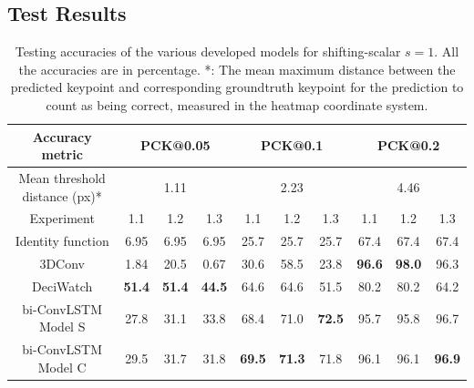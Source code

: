 \documentclass[./main.tex]{subfiles}
\begin{document}
\subsection{Test Results}
\label{subsec:pretrain_test_res}
\begin{table}[htbp]
    \begin{tabular}{c||ccc|ccc|ccc}
        \hline
        Accuracy metric & \multicolumn{3}{c}{PCK@0.05} & \multicolumn{3}{c}{PCK@0.1} & \multicolumn{3}{c}{PCK@0.2} \\
        \hline
        Mean threshold distance (px)* & \multicolumn{3}{c}{1.11} & \multicolumn{3}{c}{2.23} & \multicolumn{3}{c}{4.46} \\
        \hline
        Experiment & 1.1 & 1.2 & 1.3 & 1.1 & 1.2 & 1.3 & 1.1 & 1.2 & 1.3 \\
        \hline
        \hline
        Identity function & 6.95 & 6.95 & 6.95 & 25.7 & 25.7 & 25.7 & 67.4 & 67.4 & 67.4 \\
        3DConv & 1.84 & 20.5 & 0.67 & 30.6 & 58.5 & 23.8 & \textbf{96.6} & \textbf{98.0} & 96.3 \\
        DeciWatch & \textbf{51.4} & \textbf{51.4} & \textbf{44.5} & 64.6 & 64.6 & 51.5 & 80.2 & 80.2 & 64.2 \\
        bi-ConvLSTM Model S & 27.8 & 31.1 & 33.8 & 68.4 & 71.0 & \textbf{72.5} & 95.7 & 95.8 & 96.7\\
        bi-ConvLSTM Model C & 29.5 & 31.7 & 31.8 & \textbf{69.5} & \textbf{71.3} & 71.8 & 96.1 & 96.1 & \textbf{96.9} \\
        \hline
    \end{tabular}
    \caption{Testing accuracies of the various developed models for shifting-scalar $s = 1$. All the accuracies are in percentage. *: The mean maximum distance between the predicted keypoint and corresponding groundtruth keypoint for the prediction to count as being correct, measured in the heatmap coordinate system.}
    \label{tab:pretrain_test_accs_1}
\end{table}
\end{document}
